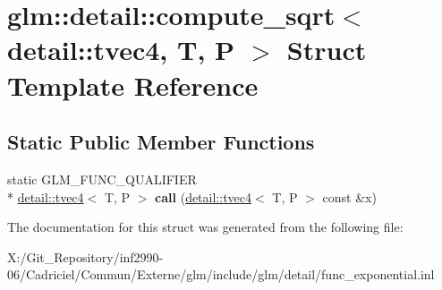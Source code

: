 \hypertarget{structglm_1_1detail_1_1compute__sqrt_3_01detail_1_1tvec4_00_01_t_00_01_p_01_4}{\section{glm\-:\-:detail\-:\-:compute\-\_\-sqrt$<$ detail\-:\-:tvec4, T, P $>$ Struct Template Reference}
\label{structglm_1_1detail_1_1compute__sqrt_3_01detail_1_1tvec4_00_01_t_00_01_p_01_4}
}
\subsection*{Static Public Member Functions}
\begin{DoxyCompactItemize}
\item 
\hypertarget{structglm_1_1detail_1_1compute__sqrt_3_01detail_1_1tvec4_00_01_t_00_01_p_01_4_a75a6bf4911534e88541e66391ffb3f6e}{static G\-L\-M\-\_\-\-F\-U\-N\-C\-\_\-\-Q\-U\-A\-L\-I\-F\-I\-E\-R \\*
\hyperlink{structglm_1_1detail_1_1tvec4}{detail\-::tvec4}$<$ T, P $>$ {\bfseries call} (\hyperlink{structglm_1_1detail_1_1tvec4}{detail\-::tvec4}$<$ T, P $>$ const \&x)}\label{structglm_1_1detail_1_1compute__sqrt_3_01detail_1_1tvec4_00_01_t_00_01_p_01_4_a75a6bf4911534e88541e66391ffb3f6e}

\end{DoxyCompactItemize}


The documentation for this struct was generated from the following file\-:\begin{DoxyCompactItemize}
\item 
X\-:/\-Git\-\_\-\-Repository/inf2990-\/06/\-Cadriciel/\-Commun/\-Externe/glm/include/glm/detail/func\-\_\-exponential.\-inl\end{DoxyCompactItemize}
